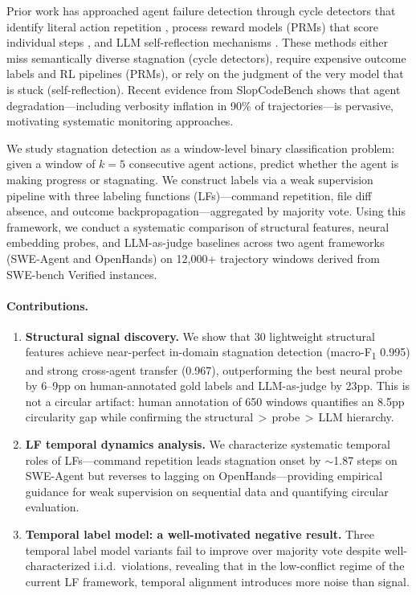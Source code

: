 \documentclass[11pt,a4paper]{article}
\newcommand{\fone}{F\textsubscript{1}}
\begin{document}
Prior work has approached agent failure detection through cycle detectors that identify literal action repetition \cite{jiang2024cdcs}, process reward models (PRMs) that score individual steps \cite{xi2026agentprm}, and LLM self-reflection mechanisms \cite{shinn2023reflexion}.
These methods either miss semantically diverse stagnation (cycle detectors), require expensive outcome labels and RL pipelines (PRMs), or rely on the judgment of the very model that is stuck (self-reflection).
Recent evidence from SlopCodeBench \cite{slopcodebench2026} shows that agent degradation---including verbosity inflation in 90\% of trajectories---is pervasive, motivating systematic monitoring approaches.

We study stagnation detection as a window-level binary classification problem: given a window of $k{=}5$ consecutive agent actions, predict whether the agent is making progress or stagnating.
We construct labels via a weak supervision pipeline with three labeling functions (LFs)---command repetition, file diff absence, and outcome backpropagation---aggregated by majority vote.
Using this framework, we conduct a systematic comparison of structural features, neural embedding probes, and LLM-as-judge baselines across two agent frameworks (SWE-Agent and OpenHands) on 12{,}000+ trajectory windows derived from SWE-bench Verified instances.

\paragraph{Contributions.}
\begin{enumerate}
\item \textbf{Structural signal discovery.} We show that 30 lightweight structural features achieve near-perfect in-domain stagnation detection (macro-\fone{} 0.995) and strong cross-agent transfer (0.967), outperforming the best neural probe by 6--9pp on human-annotated gold labels and LLM-as-judge by 23pp. This is not a circular artifact: human annotation of 650 windows quantifies an 8.5pp circularity gap while confirming the structural$\,{>}\,$probe$\,{>}\,$LLM hierarchy.

\item \textbf{LF temporal dynamics analysis.} We characterize systematic temporal roles of LFs---command repetition leads stagnation onset by $\sim$1.87 steps on SWE-Agent but reverses to lagging on OpenHands---providing empirical guidance for weak supervision on sequential data and quantifying circular evaluation.

\item \textbf{Temporal label model: a well-motivated negative result.} Three temporal label model variants fail to improve over majority vote despite well-characterized i.i.d.\ violations, revealing that in the low-conflict regime of the current LF framework, temporal alignment introduces more noise than signal.
\end{enumerate}
\end{document}
